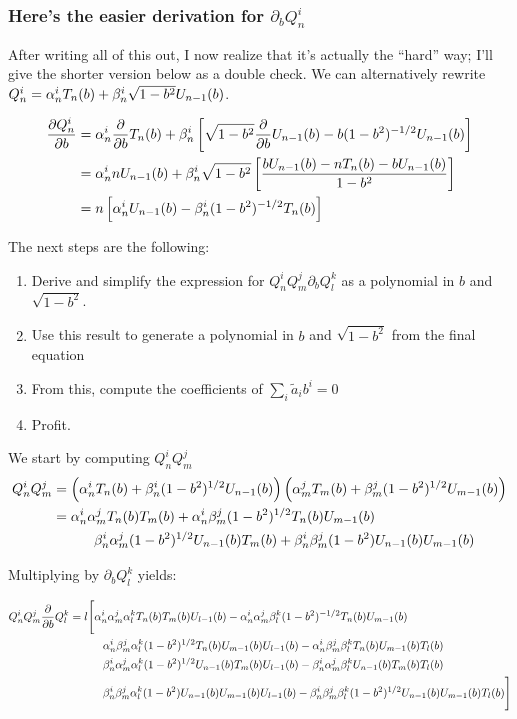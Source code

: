 \subsubsection{Here's the easier derivation for $\partial_b Q_n^i$}

After writing all of this out, I now realize that it's actually the ``hard'' way; I'll give the shorter version below as a double check.
We can alternatively rewrite $Q_n^i = \alpha_n^i T_n(b) + \beta_n^i\sqrt{1-b^2}U_{n-1}(b)$.

\begin{align*}
\frac{\partial Q_n^i}{\partial b} &= \alpha_n^i \frac{\partial}{\partial b} T_n(b) + \beta_n^i\left[\sqrt{1-b^2}\frac{\partial}{\partial b} U_{n-1}(b) - b(1-b^2)^{-1/2}U_{n-1}(b)\right]\\
								  &= \alpha_n^i n U_{n-1}(b) + \beta_n^i\sqrt{1-b^2}\left[\frac{bU_{n-1}(b) - nT_n(b) - bU_{n-1}(b)}{1-b^2}\right]\\
								  &= n\left[\alpha_n^i U_{n-1}(b) - \beta_n^i(1-b^2)^{-1/2}T_n(b)\right]
\end{align*}


The next steps are the following: 

\begin{enumerate}
\item Derive and simplify the expression for $Q_n^iQ_m^j\partial_bQ_l^k$ as a polynomial in $b$ and $\sqrt{1-b^2}$. 
\item Use this result to generate a polynomial in $b$ and $\sqrt{1-b^2}$ from the final equation
\item From this, compute the coefficients of $\sum_i \widetilde{a}_i b^i = 0$
\item Profit.
\end{enumerate}


\newcommand{\amj}{\alpha_m^j}
\newcommand{\alk}{\alpha_l^k}
\newcommand{\bmj}{\beta_m^j}
\newcommand{\blk}{\beta_l^k}

We start by computing $Q_n^iQ_m^j$
\begin{align*}
Q_n^iQ_m^j &= \left(\ani T_n(b) + \bni(1-b^2)^{1/2}U_{n-1}(b)\right)\left(\amj T_m(b) + \bmj(1-b^2)^{1/2} U_{m-1}(b)\right) \\
	   &= \ani\amj T_n(b)T_m(b) + \ani\bmj(1-b^2)^{1/2}T_n(b)U_{m-1}(b) \\
	   &\qquad\quad \bni\amj(1-b^2)^{1/2}U_{n-1}(b)T_m(b) + \bni\bmj(1-b^2)U_{n-1}(b)U_{m-1}(b)
\end{align*}

Multiplying by $\partial_b Q_l^k$ yields:

\begin{align*}
Q_n^iQ_m^j\ddb Q_l^k &= l\Bigg[\ani\amj\alk T_n(b)T_m(b) U_{l-1}(b) - \ani\amj\blk(1-b^2)^{-1/2}T_n(b) U_{m-1}(b) \\
		     &\qquad\quad \ani\bmj\alk(1-b^2)^{1/2}T_n(b) U_{m-1}(b) U_{l-1}(b) - \ani\bmj\blk T_n(b) U_{m-1}(b) T_l(b) \\
		     &\qquad\quad \bni\amj\alk(1-b^2)^{1/2}U_{n-1}(b) T_m(b) U_{l-1}(b) - \bni\amj\blk U_{n-1}(b) T_m(b) T_l(b) \\
		     &\qquad\quad \bni\bmj\alk(1-b^2)U_{n-1}(b) U_{m-1}(b) U_{l-1}(b) - \bni\bmj\blk (1-b^2)^{1/2}U_{n-1}(b)U_{m-1}(b)T_l(b)\Bigg]
\end{align*}

